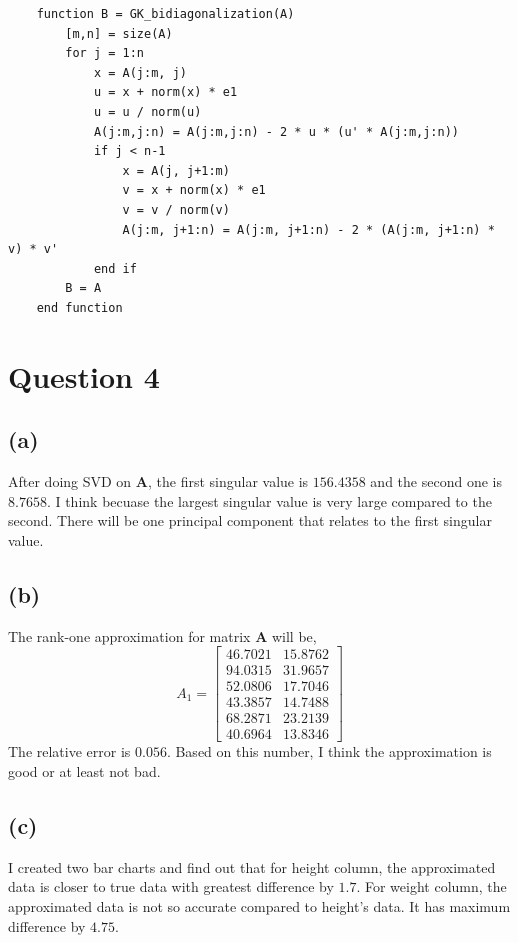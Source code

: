 \documentclass{article}
\newcommand{\bmat}[1]{\begin{bmatrix} #1 \end{bmatrix}}
\newcommand{\mat}[1]{\mathbf{#1}}
\begin{document}
\begin{verbatim}
    function B = GK_bidiagonalization(A)
        [m,n] = size(A)
        for j = 1:n
            x = A(j:m, j)
            u = x + norm(x) * e1
            u = u / norm(u)
            A(j:m,j:n) = A(j:m,j:n) - 2 * u * (u' * A(j:m,j:n))
            if j < n-1
                x = A(j, j+1:m)
                v = x + norm(x) * e1
                v = v / norm(v)
                A(j:m, j+1:n) = A(j:m, j+1:n) - 2 * (A(j:m, j+1:n) * v) * v'
            end if    
        B = A
    end function
\end{verbatim}

\section*{Question 4}
\subsection*{(a)}
After doing SVD on $\mat{A}$, the first singular value is $156.4358$ and the second one is $8.7658$. I think 
becuase the largest singular value is very large compared to the second. There will be
one principal component that relates to the first singular value.
\subsection*{(b)}

The rank-one approximation for matrix $\mat{A}$ will be, 
$$A_1 = \bmat{ 46.7021 &  15.8762\\
94.0315 &  31.9657 \\
52.0806  & 17.7046\\
43.3857  & 14.7488\\
68.2871  & 23.2139\\
40.6964  & 13.8346}$$
The relative error is $0.056$. Based on this number, I think the approximation is good or at least not bad.
\subsection*{(c)}
I created two bar charts and find out that for height column, the approximated 
data is closer to true data with greatest difference by $1.7$. For weight column,
the approximated data is not so accurate compared to height's data. It has maximum difference 
by $4.75$.
\end{document}
